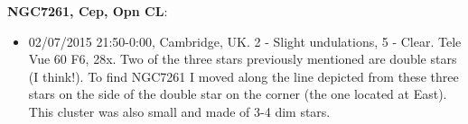 {\bf NGC7261, Cep, Opn CL}:
\begin{itemize}
\item 02/07/2015 21:50-0:00, Cambridge, UK. 2 - Slight undulations, 5 - Clear. Tele Vue 60 F6, 28x. Two of the three stars previously mentioned are double stars (I think!). To find NGC7261 I moved along the line depicted from these three stars on the side of the double star on the corner (the one located at East). This cluster was also small and made of 3-4 dim stars. 
\end{itemize}
